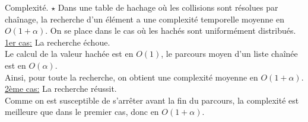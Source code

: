\documentclass[french, 11pt]{article}
\begin{document}
\begin{thm}{Complexité. $\star$}{}
    Dans une table de hachage où les collisions sont résolues par chaînage, la recherche d'un élément a une complexité temporelle moyenne en $O(1+\alpha)$.
    \tcblower
    On se place dans le cas où les hachés sont uniformément distribués.\\
    \underline{1er cas:} La recherche échoue.\\
    Le calcul de la valeur hachée est en $O(1)$, le parcours moyen d'un liste chaînée est en $O(\alpha)$.\\
    Ainsi, pour toute la recherche, on obtient une complexité moyenne en $O(1+\alpha)$.\n
    \underline{2ème cas:} La recherche réussit.\\
    Comme on est susceptible de s'arrêter avant la fin du parcours, la complexité est meilleure que dans le premier cas, donc en $O(1+\alpha)$.
\end{thm}

\fin
\end{document}
